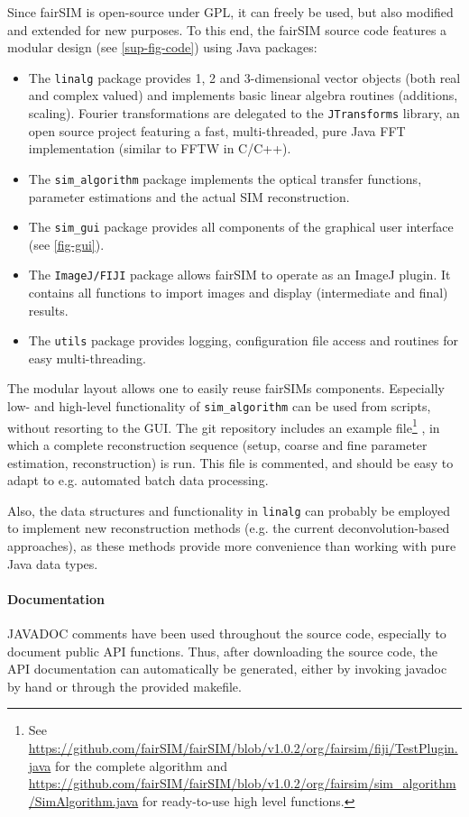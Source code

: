 \documentclass[twoside=false,
           twocolumn=false,
           a4paper,DIV=15,
           10pt]{scrartcl}
\begin{document}
Since fairSIM is open-source under GPL, it can freely be used,
but also modified and extended for new purposes. To this end,
the fairSIM source code features a modular design (see \cref{sup-fig-code})
using Java packages:

\begin{itemize}
\item  The \verb+linalg+ package provides 1, 2 and 3-dimensional
vector objects (both real and complex valued) and implements basic
linear algebra routines (additions, scaling). Fourier transformations
are delegated to the \verb+JTransforms+ library, an open source
project featuring a fast, multi-threaded, pure Java 
FFT implementation (similar to FFTW in C/C++).
\item The \verb+sim_algorithm+ package implements the optical transfer
functions, parameter estimations and the actual SIM reconstruction.
\item The \verb+sim_gui+ package provides all components of the graphical 
user interface (see \cref{fig-gui}).
\item The \verb+ImageJ/FIJI+ package allows fairSIM to operate as an
ImageJ plugin. It contains all functions to import images and display
(intermediate and final) results.
\item The \verb+utils+ package provides logging, configuration
file access and routines for easy multi-threading.
\end{itemize}

The modular layout allows one to easily reuse fairSIMs components.
Especially low- and high-level functionality of \verb+sim_algorithm+ can be
used from scripts, without resorting to the GUI. The git repository includes
an example file\footnote{
See \url{https://github.com/fairSIM/fairSIM/blob/v1.0.2/org/fairsim/fiji/TestPlugin.java}
for the complete algorithm and 
\url{https://github.com/fairSIM/fairSIM/blob/v1.0.2/org/fairsim/sim_algorithm/SimAlgorithm.java}
for ready-to-use high level functions.}
, in which a complete reconstruction sequence (setup, coarse and fine
parameter estimation, reconstruction) is run. This file is commented, and
should be easy to adapt to e.g. automated batch data processing.

Also, the data structures and functionality in \verb+linalg+ can
probably be employed to implement new reconstruction methods (e.g. the
current deconvolution-based approaches), as these methods provide more 
convenience than working with pure Java data types.

\paragraph{Documentation}
JAVADOC comments have been used throughout the source code, especially to document
public API functions. Thus, after downloading the source code, the API documentation
can automatically be generated, either by invoking javadoc by hand or through
the provided makefile.
\end{document}
